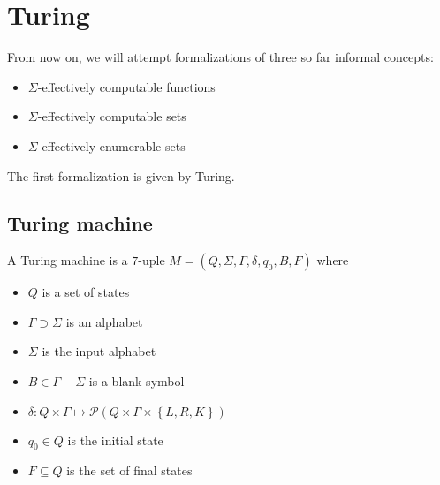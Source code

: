 \documentclass[a4paper, 12pt]{article}
\begin{document}
\section{Turing}

From now on, we will attempt formalizations of three so far informal concepts: 

\begin{itemize}
    \item $\Sigma$-effectively computable functions
    \item $\Sigma$-effectively computable sets
    \item $\Sigma$-effectively enumerable sets
\end{itemize}

The first formalization is given by Turing.

\subsection{Turing machine}

A Turing machine is a $7$-uple $M = \left( Q, \Sigma, \Gamma, \delta, q_0, B, F
\right) $ where

\begin{itemize}
    \item $Q$ is a set of states 
    \item $\Gamma \supset \Sigma$ is an alphabet
    \item $\Sigma$ is the input alphabet
    \item $B \in \Gamma - \Sigma$ is a blank symbol 
    \item $\delta : Q \times \Gamma \mapsto \mathcal{P} \left( Q \times \Gamma \times \left\{
        L, R, K\right\}  \right) $ 
    \item $q_0 \in Q$ is the initial state 
    \item $F \subseteq Q$ is the set of final states
\end{itemize}
\end{document}
